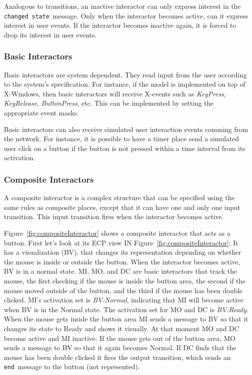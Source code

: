 \documentclass[twocolumn,10pt]{article}
\newcommand{\theEnd}{{\tt end}}
\newcommand{\changedState}{{\tt changed state}}
\begin{document}
Analogous to transitions, an inactive interactor can only express
interest in the \changedState\ message.  Only when the interactor
becomes active, can it express interest in user events.  If the
interactor becomes inactive again, it is forced to drop its
interest in user events.

\subsubsection*{Basic Interactors}

Basic interactors are system dependent.  They read input from the user
according to the system's specification.  For instance, if the model
is implemented on top of X-Windows, then basic interactors will
receive X-events such as {\em KeyPress}, {\em KeyRelease}, {\em
ButtonPress}, etc.  This can be implemented by setting the
appropriate event masks.

Basic interactors can also receive simulated user interaction events
comming from the network.  For instance, it is possible to have a
timer place send a simulated user click on a button if the button is
not pressed within a time interval from its activation.

\subsubsection*{Composite Interactors}

A composite interactor is a complex structure that can be specified
using the same rules as composite places, except that it can have one
and only one input transition.  This input transition fires when the
interactor becomes active.

Figure~\ref{fig:compositeInteractor} shows a composite interactor that
acts as a button.  First let's look at its ECP view 
IN Figure~\ref{fig:compositeInteractor}: It has a
visualization (BV), that changes its representation depending on
whether the mouse is inside or outside the button.  When the
interactor becomes active, BV is in a normal state.  MI, MO, and DC
are basic interactors that track the mouse, the first checking if the
mouse is inside the button area, the second if the mouse moved outside
of the button, and the third if the mouse has been double clicked.
MI's activation set is {\em BV:Normal}, indicating that MI will
become active when BV is in the Normal state.  The activation set for
MO and DC is {\em BV:Ready}.  When the mouse gets inside the button
area MI sends a message to BV so that it changes its state to Ready
and shows it visually.  At that moment MO and DC become active and MI
inactive.  If the mouse gets out of the button area, MO sends a
message to BV so that it again becomes Normal.  If DC finds that the
mouse has been double clicked it fires the output transition, which
sends an \theEnd\ message to the button (not represented).
\end{document}
